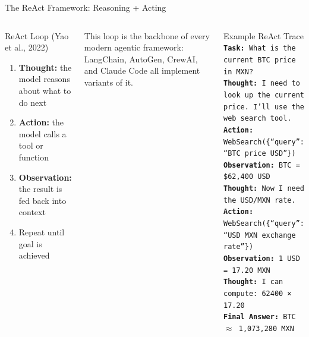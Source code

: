 \documentclass[aspectratio=169,xcolor=dvipsnames]{beamer}
\begin{document}
\begin{frame}{The ReAct Framework: Reasoning + Acting}
    \begin{columns}
        \begin{block}{ReAct Loop (Yao et al., 2022)}
            \begin{enumerate}
                \item \textbf{Thought:} the model reasons about what to do next
                \item \textbf{Action:} the model calls a tool or function
                \item \textbf{Observation:} the result is fed back into context
                \item Repeat until goal is achieved
            \end{enumerate}
        \end{block}
        \vspace{0.2cm}
        This loop is the backbone of every modern agentic framework: LangChain, AutoGen, CrewAI, and Claude Code all implement variants of it.

        \begin{exampleblock}{Example ReAct Trace}
            \texttt{\scriptsize
            \textbf{Task:} What is the current BTC price in MXN?\\[4pt]
            \textbf{Thought:} I need to look up the current price. I'll use the web search tool.\\[4pt]
            \textbf{Action:} WebSearch(\{``query'': ``BTC price USD''\})\\[4pt]
            \textbf{Observation:} BTC = \$62,400 USD\\[4pt]
            \textbf{Thought:} Now I need the USD/MXN rate.\\[4pt]
            \textbf{Action:} WebSearch(\{``query'': ``USD MXN exchange rate''\})\\[4pt]
            \textbf{Observation:} 1 USD = 17.20 MXN\\[4pt]
            \textbf{Thought:} I can compute: 62400 × 17.20\\[4pt]
            \textbf{Final Answer:} BTC $\approx$ 1,073,280 MXN
            }
        \end{exampleblock}
    \end{columns}
\end{frame}
\end{document}

